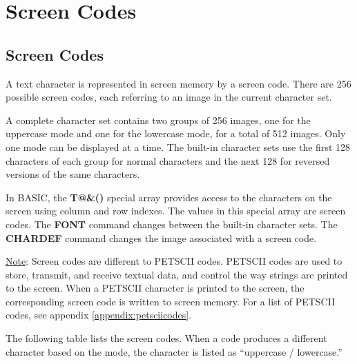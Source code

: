 \chapter{Screen Codes}

\section{Screen Codes}

\label{appendix:screencodes}

A text character is represented in screen memory by a screen code. There are 256 possible screen codes, each referring to an image in the current character set.

A complete character set contains two groups of 256 images, one for the uppercase mode and one for the lowercase mode, for a total of 512 images. Only one mode can be displayed at a time. The built-in character sets use the first 128 characters of each group for normal characters and the next 128 for reversed versions of the same characters.

In BASIC, the {\bf T@\&()} special array provides access to the characters on the screen using column and row indexes. The values in this special array are screen codes. The {\bf FONT} command changes between the built-in character sets. The {\bf CHARDEF} command changes the image associated with a screen code.

\underline{Note}: Screen codes are different to PETSCII codes. PETSCII codes are used to store, transmit, and receive textual data, and control the way strings are printed to the screen. When a PETSCII character is printed to the screen, the corresponding screen code is written to screen memory. For a list of PETSCII codes, see appendix \vref{appendix:petsciicodes}.

The following table lists the screen codes. When a code produces a different character based on the mode, the character is listed as ``uppercase / lowercase.''

